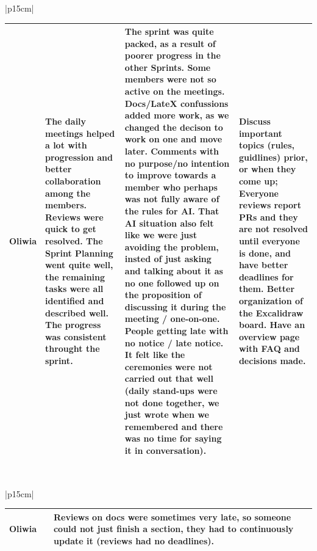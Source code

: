 \begin{table}[H]
    \centering
    \begin{tabular}{|p{15cm}|} 
        \hline
        \begin{table}[H]
            \begin{tabular}{|p{1.75cm}|p{4cm}|p{4cm}|p{4cm}|}
                \hline
                \cellcolor[HTML]{d4d4d4} Oliwia & The daily meetings helped a lot with progression and better collaboration among the members. Reviews were quick to get resolved. The Sprint Planning went quite well, the remaining tasks were all identified and described well. The progress was consistent throught the sprint.  & The sprint was quite packed, as a result of poorer progress in the other Sprints. Some members were not so active on the meetings. Docs/LateX confussions added more work, as we changed the decison to work on one and move later. Comments with no purpose/no intention to improve towards a member who perhaps was not fully aware of the rules for AI. That AI situation also felt like we were just avoiding the problem, insted of just asking and talking about it as no one followed up on the proposition of discussing it during the meeting / one-on-one. People getting late with no notice / late notice. It felt like the ceremonies were not carried out that well (daily stand-ups were not done together, we just wrote when we remembered and there was no time for saying it in conversation). & Discuss important topics (rules, guidlines) prior, or when they come up; Everyone reviews report PRs and they are not resolved until everyone is done, and have better deadlines for them. Better organization of the Excalidraw board. \newline \newline Have an overview page with FAQ and decisions made. \\
                \hline
            \end{tabular}
        \end{table}
        \\
        \hline
    \end{tabular}
\end{table}

\begin{table}[H]
    \centering
    \begin{tabular}{|p{15cm}|} 
        \hline
        \begin{table}[H]
            \begin{tabular}{|p{1.75cm}|p{4cm}|p{4cm}|p{4cm}|}
                \hline
                \cellcolor[HTML]{d4d4d4} Oliwia & & Reviews on docs were sometimes very late, so someone could not just finish a section, they had to continuously update it (reviews had no deadlines). &  \\
                \hline
            \end{tabular}
        \end{table}
        \\
        \hline
    \end{tabular}
\end{table}

